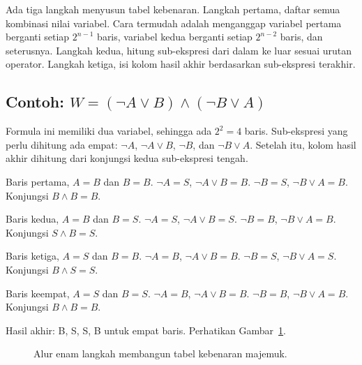 \documentclass[11pt,a4paper]{article}
\begin{document}
Ada tiga langkah menyusun tabel kebenaran. Langkah pertama, daftar semua kombinasi nilai variabel. Cara termudah adalah menganggap variabel pertama berganti setiap $2^{n-1}$ baris, variabel kedua berganti setiap $2^{n-2}$ baris, dan seterusnya. Langkah kedua, hitung sub-ekspresi dari dalam ke luar sesuai urutan operator. Langkah ketiga, isi kolom hasil akhir berdasarkan sub-ekspresi terakhir.

\subsection{Contoh: $W=(\neg A \vee B) \wedge (\neg B \vee A)$}

Formula ini memiliki dua variabel, sehingga ada $2^2=4$ baris. Sub-ekspresi yang perlu dihitung ada empat: $\neg A$, $\neg A \vee B$, $\neg B$, dan $\neg B \vee A$. Setelah itu, kolom hasil akhir dihitung dari konjungsi kedua sub-ekspresi tengah.

Baris pertama, $A=B$ dan $B=B$. $\neg A=S$, $\neg A \vee B=B$. $\neg B=S$, $\neg B \vee A=B$. Konjungsi $B \wedge B=B$.

Baris kedua, $A=B$ dan $B=S$. $\neg A=S$, $\neg A \vee B=S$. $\neg B=B$, $\neg B \vee A=B$. Konjungsi $S \wedge B=S$.

Baris ketiga, $A=S$ dan $B=B$. $\neg A=B$, $\neg A \vee B=B$. $\neg B=S$, $\neg B \vee A=S$. Konjungsi $B \wedge S=S$.

Baris keempat, $A=S$ dan $B=S$. $\neg A=B$, $\neg A \vee B=B$. $\neg B=B$, $\neg B \vee A=B$. Konjungsi $B \wedge B=B$.

Hasil akhir: B, S, S, B untuk empat baris. Perhatikan Gambar~\ref{fig:tabel-flow}.

\begin{figure}[H]
	\centering
	\caption{Alur enam langkah membangun tabel kebenaran majemuk.}
	\label{fig:tabel-flow}
\end{figure}
\end{document}
